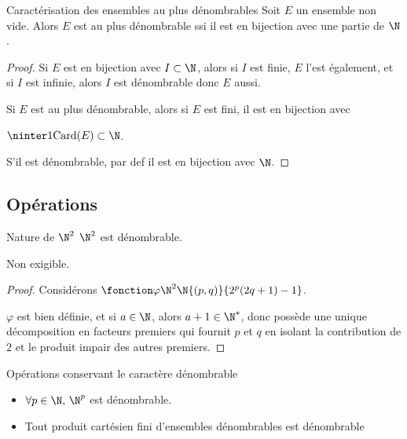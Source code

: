 \begin{proposition}{Caractérisation des ensembles au plus dénombrables}{}
    Soit $E$ un ensemble non vide. Alors $E$ est au plus dénombrable ssi il est en 
    bijection avec une partie de $\N$.
\end{proposition}


\begin{proof}
    Si $E$ est en bijection avec $I \subset \N$, alors si $I$ est finie, 
    $E$ l'est également, et si $I$ est infinie, alors $I$ est dénombrable donc $E$ aussi.

    \lvspace Si $E$ est au plus dénombrable, alors si $E$ est fini, il est en bijection 
    avec 
    
    $\ninter 1 {\text{Card}(E)} \subset \N$.

    S'il est dénombrable, par def il est en bijection avec $\N$.
\end{proof}


\subsection{Opérations }

\begin{theoreme}{Nature de $\N^2$}{}
    $\N^2$ est dénombrable.
\end{theoreme}

Non exigible. 

\begin{proof}
    Considérons $\fonction \varphi {\N^2} \N {(p, q)}{2^p (2q + 1) - 1}$.

    $\varphi$ est bien définie, et si $a \in \N$, alors $a + 1 \in \N^*$, donc possède 
    une unique décomposition en facteurs premiers qui fournit $p$ et $q$ en isolant 
    la contribution de $2$ et le produit impair des autres premiers. 
\end{proof}

\begin{proposition}{Opérations conservant le caractère dénombrable}{}
    \begin{itemize}
        \item $\forall p \in \N, \, \N^p$ est dénombrable.
        \item Tout produit cartésien fini d'ensembles dénombrables est dénombrable
    \end{itemize}

\end{proposition}


